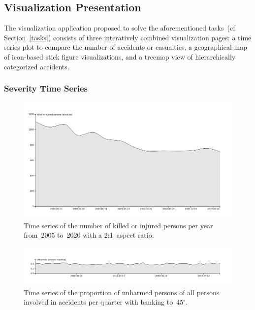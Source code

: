 \subsection{Visualization Presentation}
\label{presentation}
The visualization application proposed to solve the aforementioned tasks~(cf. Section~\ref{tasks}) consists of three interatively combined visualization pages: \Ni a time series plot to compare the number of accidents or casualties, \Nii a geographical map of icon-based stick figure visualizations, and \Niii a treemap view of hierarchically categorized accidents.

\subsubsection{Severity Time Series}
\begin{figure}
    \centering
    \includegraphics[width=0.9\linewidth]{figures/time-series-2-to-1-killed-or-injured-absolute-never-per-year.png}
    \caption{Time series of the number of killed or injured persons per year from~2005 to~2020 with a 2:1~aspect ratio.}
    \label{figure-time-series-killed-injured-per-year}
\end{figure}
\begin{figure}
    \centering
    \includegraphics[width=0.9\linewidth]{figures/time-series-banking-45-unharmed-relative-never-per-quarter.png}
    \caption{Time series of the proportion of unharmed persons of all persons involved in accidents per quarter with banking to~45\(^\circ\).}
    \label{figure-time-series-banking-unharmed-relative-per-quarter}
\end{figure}
